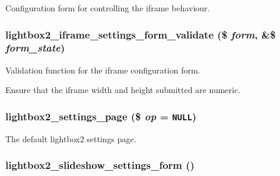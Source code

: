Configuration form for controlling the iframe behaviour. \hypertarget{lightbox2_8admin_8inc_fd229c41efdfdb2353545b7c5f61df33}{
\subsubsection[{lightbox2\_\-iframe\_\-settings\_\-form\_\-validate}]{\setlength{\rightskip}{0pt plus 5cm}lightbox2\_\-iframe\_\-settings\_\-form\_\-validate (\$ {\em form}, \/  \&\$ {\em form\_\-state})}}
\label{lightbox2_8admin_8inc_fd229c41efdfdb2353545b7c5f61df33}


Validation function for the iframe configuration form.

Ensure that the iframe width and height submitted are numeric. \hypertarget{lightbox2_8admin_8inc_a8d608663e0a4cb36fbecf86120cde98}{
\subsubsection[{lightbox2\_\-settings\_\-page}]{\setlength{\rightskip}{0pt plus 5cm}lightbox2\_\-settings\_\-page (\$ {\em op} = {\tt NULL})}}
\label{lightbox2_8admin_8inc_a8d608663e0a4cb36fbecf86120cde98}


The default lightbox2 settings page. \hypertarget{lightbox2_8admin_8inc_1e5726ae1be5d069af4e20160109f43b}{
\subsubsection[{lightbox2\_\-slideshow\_\-settings\_\-form}]{\setlength{\rightskip}{0pt plus 5cm}lightbox2\_\-slideshow\_\-settings\_\-form ()}}
\label{lightbox2_8admin_8inc_1e5726ae1be5d069af4e20160109f43b}



